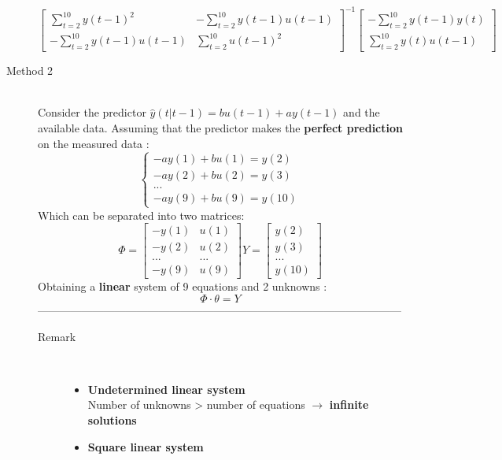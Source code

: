 \begin{description}
$$			\begin{bmatrix}
		\sum\limits_{t=2}^{10}y(t-1)^2 & -\sum\limits_{t=2}^{10}y(t-1)u(t-1) \\
		-\sum\limits_{t=2}^{10}y(t-1)u(t-1) & \sum\limits_{t=2}^{10}u(t-1)^2	
			\end{bmatrix}^{-1}
			\begin{bmatrix}
			-\sum\limits_{t=2}^{10}y(t-1)y(t) \\
			\sum\limits_{t=2}^{10}y(t)u(t-1)
\end{bmatrix}					             
             $$ 
\item[Method 2]\hfill\\
Consider the predictor $\hat{y}(t|t-1)= bu(t-1)+ay(t-1) $ and the available data.
Assuming that the predictor makes the \textbf{perfect prediction} on the measured data :
\[ 
\begin{cases}
 -ay(1)+bu(1)=y(2) \\
 -ay(2)+bu(2)=y(3) \\
 ...\\
 -ay(9)+bu(9)=y(10)
\end{cases}
\]
Which can be separated into two matrices:
$$ 	\Phi = \begin{bmatrix}
          	  -y(1) & u(1) \\
              -y(2) & u(2) \\
              ...   & ...  \\
              -y(9) & u(9) 
             \end{bmatrix}
            Y= \begin{bmatrix}
             y(2)\\
             y(3) \\
             ... \\
             y(10)
             \end{bmatrix}$$
Obtaining a \textbf{linear} system of 9 equations and 2 unknowns :
\[
\boxed{\Phi \cdot \theta = Y} 
\]
---------------------------------------------------------------------------------------------------
\begin{description}
\item[Remark]\hfill\\
\begin{itemize}
\item \textbf{Undetermined linear system}\\
Number of unknowns > number of equations $\to$ \textbf{infinite solutions}
\item \textbf{Square linear system}\\

\end{itemize}
\end{description}
\end{description}
